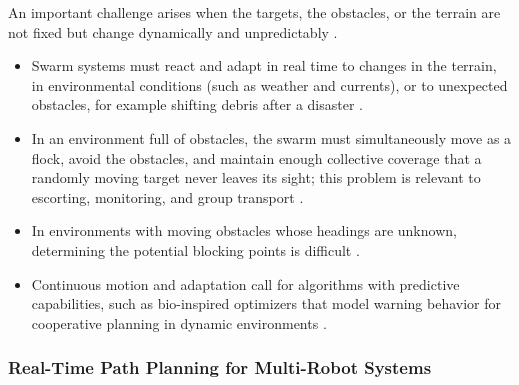 An important challenge arises when the targets, the obstacles, or the terrain are
not fixed but change dynamically and unpredictably \cite{tan2016handbook,lin2022review}.
\begin{itemize}
  \item {} Swarm systems must react and adapt in real
        time to changes in the terrain, in environmental conditions (such as
        weather and currents), or to unexpected obstacles, for example shifting
        debris after a disaster \cite{bhowmick2024bio}.
  \item {} In an environment full of obstacles,
        the swarm must simultaneously move as a flock, avoid the obstacles, and
        maintain enough collective coverage that a randomly moving target never
        leaves its sight; this problem is relevant to escorting, monitoring, and
        group transport \cite{tan2016handbook}.
  \item {} In environments with moving obstacles
        whose headings are unknown, determining the potential blocking points is
        difficult \cite{li2021rrt}.
  \item {} Continuous motion and adaptation call for
        algorithms with predictive capabilities, such as bio-inspired optimizers
        that model warning behavior for cooperative planning in dynamic
        environments \cite{lin2022review}.
\end{itemize}

\subsubsection{Real-Time Path Planning for Multi-Robot Systems}

